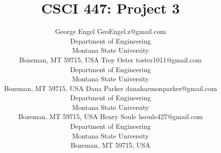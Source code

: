 \documentclass[twoside,11pt]{article}
\begin{document}
\title{CSCI 447: Project 3}

\author{\name George Engel \email GeoEngel.z@gmail.com \\
       \addr Department of Engineering\\
       Montana State University\\
       Bozeman, MT 59715, USA
       \AND
       \name Troy Oster \email toster1011@gmail.com \\
       \addr Department of Engineering\\
       Montana State University\\
       Bozeman, MT 59715, USA
       \AND
       \name Dana Parker \email danaharmonparker@gmail.com \\
       \addr Department of Engineering\\
       Montana State University\\
       Bozeman, MT 59715, USA
       \AND
       \name Henry Soule \email hsoule427@gmail.com \\
       \addr Department of Engineering\\
       Montana State University\\
       Bozeman, MT 59715, USA}


\maketitle
\end{document}
